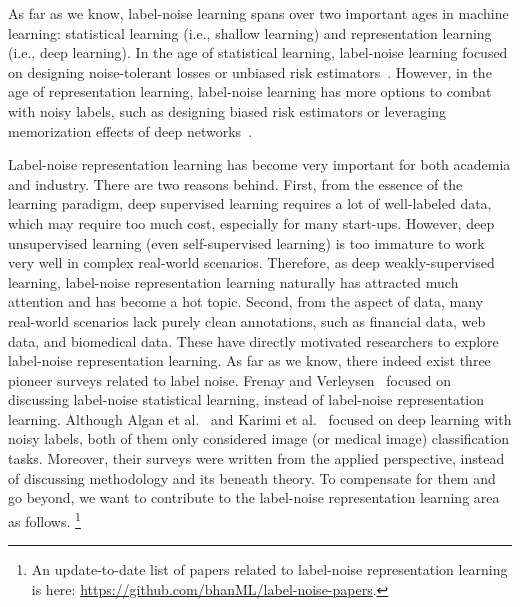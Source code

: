 As far as we know, label-noise learning spans over two important ages in machine learning: statistical learning (i.e., shallow learning) and representation learning (i.e., deep learning). In the age of statistical learning, label-noise learning focused on designing noise-tolerant losses or unbiased risk estimators~. However, in the age of representation learning, label-noise learning has more options to combat with noisy labels, such as designing biased risk estimators or leveraging memorization effects of deep networks~.

Label-noise representation learning has become very important for both academia and industry. There are two reasons behind. First, from the essence of the learning paradigm, deep supervised learning requires a lot of well-labeled data, which may require too much cost, especially for many start-ups. However, deep unsupervised learning (even self-supervised learning) is too immature to work very well in complex real-world scenarios. Therefore, as deep weakly-supervised learning, label-noise representation learning naturally has attracted much attention and has become a hot topic. Second, from the aspect of data, many real-world scenarios lack purely clean annotations, such as financial data, web data, and biomedical data. These have directly motivated researchers to explore label-noise representation learning.
As far as we know, there indeed exist three pioneer surveys related to label noise. 
Frenay and Verleysen~ focused on discussing label-noise statistical learning, 
instead of label-noise representation learning.
Although Algan et al.~ and Karimi et al.~ focused on deep learning with noisy labels, 
both of them only considered image (or medical image) classification tasks. 
Moreover, their surveys were written from the applied perspective, instead of discussing methodology and its beneath theory.
To compensate for them and go beyond, we want to contribute to the label-noise representation learning area as follows.
\footnote{An update-to-date list of papers related to label-noise representation learning is here: \url{https://github.com/bhanML/label-noise-papers}.}
